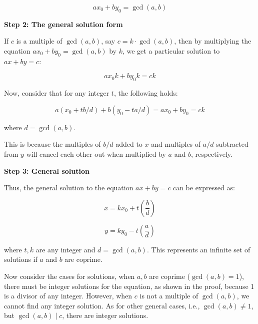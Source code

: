 \begin{equation}
ax_0 + by_0 = \gcd(a, b)
\end{equation}

\textbf{Step 2: The general solution form}

If \(c\) is a multiple of \(\gcd(a, b)\), say \(c = k \cdot \gcd(a, b)\), then by multiplying the equation \(ax_0 + by_0 = \gcd(a, b)\) by \(k\), we get a particular solution to \(ax + by = c\):

\begin{equation}
ax_0k + by_0k = ck
\end{equation}

Now, consider that for any integer \(t\), the following holds:

\begin{equation}
a(x_0 + tb/d) + b(y_0 - ta/d) = ax_0 + by_0 = ck
\end{equation}

where \(d = \gcd(a, b)\). 

This is because the multiples of \(b/d\) added to \(x\) and multiples of \(a/d\) subtracted from \(y\) will cancel each other out when multiplied by \(a\) and \(b\), respectively.

\textbf{Step 3: General solution}

Thus, the general solution to the equation \(ax + by = c\) can be expressed as:

\begin{equation}
x = kx_0 + t\left(\frac{b}{d}\right)
\end{equation}

\begin{equation}
y = ky_0 - t\left(\frac{a}{d}\right)
\end{equation}

where \(t, k\) are any integer and $d = \gcd(a,b)$. This represents an infinite set of solutions if \(a\) and \(b\) are coprime.
\begin{corollary}
    Now consider the cases for solutions, when $a,b$ are coprime ($\gcd(a,b)=1$), there must be integer solutions for the equation,
as shown in the proof, because 1 is a divisor of any integer. However, when $c$ is not a multiple
of $\gcd(a, b)$, we cannot find any integer solution. As for other general cases, i.e., $\gcd(a, b)\neq 1$,
but $\gcd(a,b)\mid c$, there are integer solutions.
\end{corollary}

